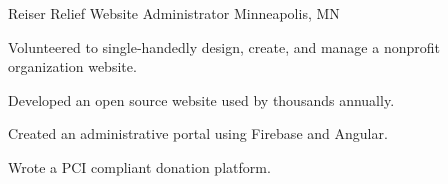 \begin{cventries}
    \cventry
    {Reiser Relief} %
    {Website Administrator} %
    {Minneapolis, MN} %
    {} %
    {
    \begin{cvitems} %
        \item {Volunteered to single‑handedly design, create, and manage a nonprofit organization website.}
        \item {Developed an open source website used by thousands annually.}
        \item {Created an administrative portal using Firebase and Angular.}
        \item {Wrote a PCI compliant donation platform.}
    \end{cvitems}
    }

\end{cventries}
